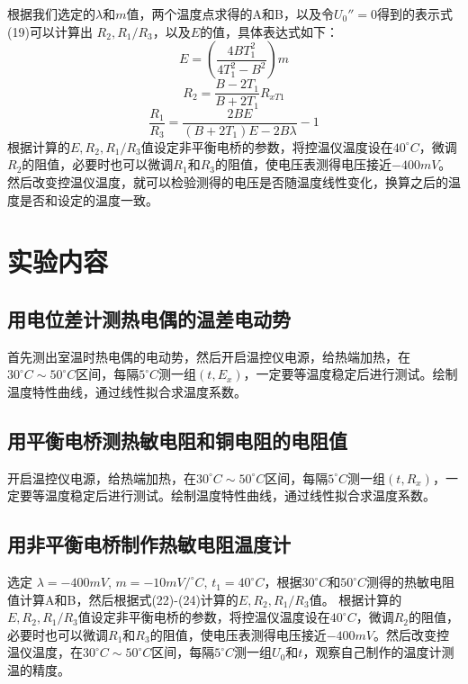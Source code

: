 \documentclass[11pt]{article}
\begin{document}
根据我们选定的$\lambda$和$m$值，两个温度点求得的A和B，以及令$U_0''=0$得到的表示式(19)可以计算出 $R_2, R_1/R_3$，以及$E$的值，具体表达式如下：
\begin{equation}
    E = \left( \frac{4BT_1^2}{4T_1^2-B^2} \right) m
\end{equation}
\begin{equation}
    R_2 = \frac{B-2T_1}{B+2T_1} R_{xT1}
\end{equation}
\begin{equation}
    \frac{R_1}{R_3} = \frac{2BE}{(B+2T_1)E-2B\lambda} - 1
\end{equation}
根据计算的$E, R_2, R_1/R_3$值设定非平衡电桥的参数，将控温仪温度设在$40^\circ C$，微调$R_2$的阻值，必要时也可以微调$R_1$和$R_3$的阻值，使电压表测得电压接近$-400mV$。然后改变控温仪温度，就可以检验测得的电压是否随温度线性变化，换算之后的温度是否和设定的温度一致。

\section{实验内容}

\subsection{用电位差计测热电偶的温差电动势}
首先测出室温时热电偶的电动势，然后开启温控仪电源，给热端加热，在$30^\circ C \sim 50^\circ C$区间，每隔$5^\circ C$测一组$(t, E_x)$，一定要等温度稳定后进行测试。绘制温度特性曲线，通过线性拟合求温度系数。

\subsection{用平衡电桥测热敏电阻和铜电阻的电阻值}
开启温控仪电源，给热端加热，在$30^\circ C \sim 50^\circ C$区间，每隔$5^\circ C$测一组$(t, R_x)$，一定要等温度稳定后进行测试。绘制温度特性曲线，通过线性拟合求温度系数。

\subsection{用非平衡电桥制作热敏电阻温度计}
选定 $\lambda=-400mV$, $m=-10mV/^\circ C$, $t_1=40^\circ C$，根据$30^\circ C$和$50^\circ C$测得的热敏电阻值计算A和B，然后根据式(22)-(24)计算的$E, R_2, R_1/R_3$值。
根据计算的$E, R_2, R_1/R_3$值设定非平衡电桥的参数，将控温仪温度设在$40^\circ C$，微调$R_2$的阻值，必要时也可以微调$R_1$和$R_3$的阻值，使电压表测得电压接近$-400mV$。然后改变控温仪温度，在$30^\circ C \sim 50^\circ C$区间，每隔$5^\circ C$测一组$U_0$和$t$，观察自己制作的温度计测温的精度。
\end{document}
